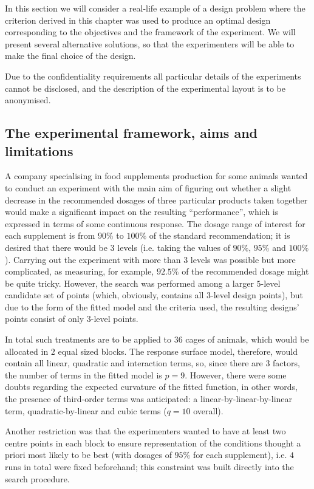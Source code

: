 
In this section we will consider a real-life example of a design problem where the criterion derived in this chapter was used to produce an optimal design corresponding to the objectives and the framework of the experiment. We will present several alternative solutions, so that the experimenters will be able to make the final choice of the design. 

Due to the confidentiality requirements all particular details of the experiments cannot be disclosed, and the description of the experimental layout is to be anonymised.

\subsection{The experimental framework, aims and limitations}
A company specialising in food supplements production for some animals wanted to conduct an experiment with the main aim of figuring out whether a slight decrease in the recommended dosages of three particular products taken together would make a significant impact on the resulting ``performance'', which is expressed in terms of some continuous response. The dosage range of interest for each supplement is from $90\%$ to $100\%$ of the standard recommendation; it is desired that there would be $3$ levels (i.e. taking the values of $90\%$, $95\%$ and $100\%$). Carrying out the experiment with more than $3$ levels was possible but more complicated, as measuring, for example, $92.5\%$ of the recommended dosage might be quite tricky. However, the search was performed among a larger $5$-level candidate set of points (which, obviously, contains all $3$-level design points), but due to the form of the fitted model and the criteria used, the resulting designs' points consist of only $3$-level points.

In total such treatments are to be applied to $36$ cages of animals, which would be allocated in $2$ equal sized blocks. The response surface model, therefore, would contain all linear, quadratic and interaction terms, so, since there are $3$ factors, the number of terms in the fitted model is $p=9$.  However, there were some doubts regarding the expected curvature of the fitted function, in other words, the presence of third-order terms was anticipated: a linear-by-linear-by-linear term, quadratic-by-linear and cubic terms ($q=10$ overall). 

Another restriction was that the experimenters wanted to have at least two centre points in each block to ensure representation of the conditions thought a priori most likely to be best (with dosages of $95\%$ for each supplement), i.e. $4$ runs in total were fixed beforehand; this constraint was built directly into the search procedure.

